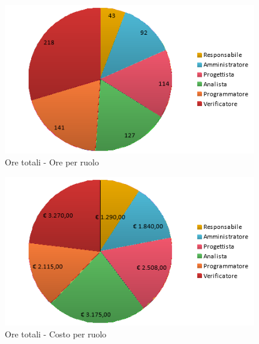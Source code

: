 \documentclass[./PianoDiProgetto.tex]{subfiles}
\begin{document}
	\begin{figure}[H]
		\centering
		\includegraphics[width=11cm, trim=1cm 0cm 1cm 0cm]{grafici/TOT-ruolo}
			\caption{Ore totali - Ore per ruolo}
	\end{figure}

\newpage

\vfill
	\begin{figure}[H]
		\centering
		\includegraphics[width=11cm, trim=1cm 0cm 1cm 0cm]{grafici/TOT-costo}
			\caption{Ore totali - Costo per ruolo}
	\end{figure}
\vfill
\newpage
\end{document}
